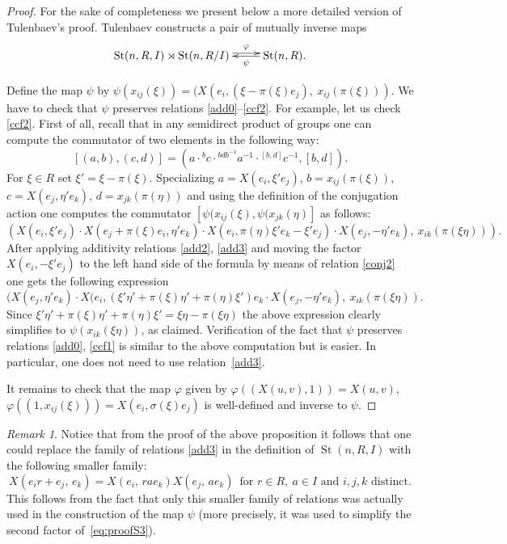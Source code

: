 \documentclass[11pt]{amsart}
\theoremstyle{plain} \declaretheorem[name=Theorem, Refname={Theorem,Theorems}]{tm} \Crefname{tm}{Theorem}{Theorems}
\numberwithin{equation}{section}
\theoremstyle{definition} \newtheorem{df}[lm]{Definition} \Crefname{df}{Definition}{Definitions}
\theoremstyle{remark} \newtheorem{rk}[lm]{Remark} \Crefname{rk}{Remark}{Remarks}
\newcommand{\St}{\mathop{\mathrm{St}}\nolimits}
\begin{document}
\begin{proof} For the sake of completeness we present below a more detailed version of Tulenbaev's proof.
Tulenbaev constructs a pair of mutually inverse maps
$$\xymatrix{ \St(n, R, I) \rtimes \St(n, R/I) \ar@<0.6ex>[r]^-\varphi &  \ar[l]^-\psi \St(n, R).}$$

Define the map $\psi$ by $\psi(x_{ij}(\xi)) = (X(e_i, (\xi - \pi(\xi)e_j),\ x_{ij}(\pi(\xi)))$. 
We have to check that $\psi$ preserves relations \eqref{add0}--\eqref{ccf2}.
For example, let us check \eqref{ccf2}. 
First of all, recall that in any semidirect product of groups one can compute the commutator of two elements in the following way:
$$[(a, b), (c, d)] = (a \cdot {}^bc \cdot {}^{bdb^{-1}}a^{-1} \cdot {}^{[b, d]}c^{-1} , [b, d]).$$
For $\xi\in R$ set $\xi' = \xi - \pi(\xi)$.
Specializing $a = X(e_i, \xi' e_j)$, $b = x_{ij}(\pi(\xi))$, $c = X(e_j, \eta'e_k)$, $d = x_{jk}(\pi(\eta))$ and using the definition of the conjugation action 
one computes the commutator $[\psi(x_{ij}(\xi), \psi(x_{jk}(\eta)]$ as follows:
\setcounter{equation}{2}
\begin{equation} \left(X(e_i, \xi' e_j) \cdot X(e_j + \pi(\xi)e_i, \eta'e_k) \cdot X(e_i, \pi(\eta)\xi' e_k - \xi' e_j) \cdot X(e_j, -\eta'e_k),\ x_{ik}(\pi(\xi\eta))\right). \label{eq:proofS3}\end{equation}
\setcounter{lm}{3}
After applying additivity relations \eqref{add2}, \eqref{add3} and moving the factor $X(e_i, -\xi' e_j)$ to the left hand side of the formula by means of relation \eqref{conj2}
one gets the following expression
$$(X(e_j, \eta'e_k) \cdot X(e_i, (\xi' \eta' + \pi(\xi)\eta' + \pi(\eta)\xi')e_k \cdot X(e_j, -\eta'e_k),\ x_{ik}(\pi(\xi\eta)).$$
Since $\xi'\eta' + \pi(\xi)\eta' + \pi(\eta)\xi' = \xi\eta - \pi(\xi\eta)$ the above expression clearly simplifies to $\psi(x_{ik}(\xi\eta))$, as claimed.
Verification of the fact that $\psi$ preserves relations \eqref{add0}, \eqref{ccf1} is similar to the above computation but is easier.
In particular, one does not need to use relation~\eqref{add3}.

It remains to check that the map $\varphi$ given by $\varphi\left((X(u, v), 1)\right) = X(u, v),$ $\varphi\left((1, x_{ij}(\xi))\right) = X(e_i, \sigma(\xi)e_j)$
is well-defined and inverse to $\psi$.
\end{proof}

\begin{rk} \label{rk:T123'} Notice that from the proof of the above proposition it follows that one could replace the family of relations \eqref{add3}
in the definition of $\St(n, R, I)$ with the following smaller family:
\setcounter{equation}{2} \renewcommand{\theequation}{T\arabic{equation}'}
\begin{equation} X(e_ir+e_j,\,e_k)=X(e_i,\,rae_k)X(e_j,\,ae_k)\,\text{ for }r\in R,\ a\in I\text{ and } i,j,k\text{ distinct}. \label{add3'} \end{equation} 
This follows from the fact that only this smaller family of relations was actually used in the construction of the map $\psi$
(more precisely, it was used to simplify the second factor of~\eqref{eq:proofS3}). \end{rk}
\end{document}

